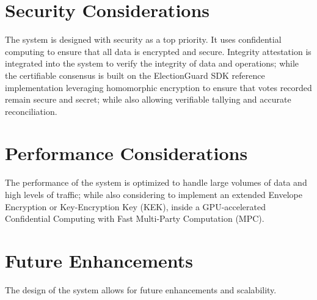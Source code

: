\documentclass[11pt,a4paper]{article}
\begin{document}
\section{Security Considerations} The system is designed with security as a top priority. It uses confidential computing to ensure that all data is encrypted and secure. Integrity attestation is integrated into the system to verify the integrity of data and operations; while the certifiable consensus is built on the ElectionGuard SDK reference implementation leveraging homomorphic encryption to ensure that votes recorded remain secure and secret; while also allowing verifiable tallying and accurate reconciliation.

\section{Performance Considerations} The performance of the system is optimized to handle large volumes of data and high levels of traffic; while also considering to implement an extended Envelope Encryption or Key-Encryption Key (KEK), inside a GPU-accelerated Confidential Computing with Fast Multi-Party Computation (MPC).

\section{Future Enhancements} The design of the system allows for future enhancements and scalability.
\end{document}
